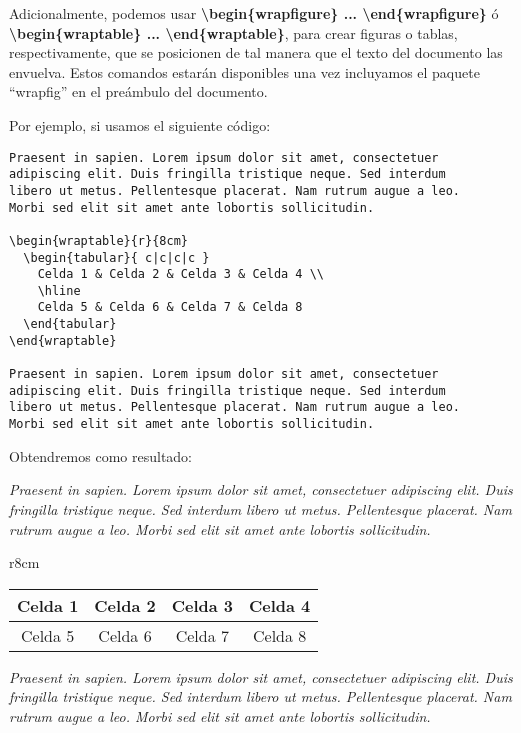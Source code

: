 Adicionalmente, podemos usar \textbf{\textbackslash begin\{wrapfigure\} ... \textbackslash end\{wrapfigure\}} ó \textbf{\textbackslash begin\{wraptable\} ... \textbackslash end\{wraptable\}}, para crear figuras o tablas, respectivamente, que se posicionen de tal manera que el texto del documento las envuelva. Estos comandos estarán disponibles una vez incluyamos el paquete ``wrapfig'' en el preámbulo del documento.

Por ejemplo, si usamos el siguiente código:

\begin{lstlisting}[language={[LaTeX]TeX}]
Praesent in sapien. Lorem ipsum dolor sit amet, consectetuer 
adipiscing elit. Duis fringilla tristique neque. Sed interdum 
libero ut metus. Pellentesque placerat. Nam rutrum augue a leo. 
Morbi sed elit sit amet ante lobortis sollicitudin.

\begin{wraptable}{r}{8cm}
  \begin{tabular}{ c|c|c|c }
    Celda 1 & Celda 2 & Celda 3 & Celda 4 \\
    \hline
    Celda 5 & Celda 6 & Celda 7 & Celda 8
  \end{tabular}
\end{wraptable}

Praesent in sapien. Lorem ipsum dolor sit amet, consectetuer 
adipiscing elit. Duis fringilla tristique neque. Sed interdum 
libero ut metus. Pellentesque placerat. Nam rutrum augue a leo. 
Morbi sed elit sit amet ante lobortis sollicitudin.
\end{lstlisting}


Obtendremos como resultado:

\emph{Praesent in sapien. Lorem ipsum dolor sit amet, consectetuer 
adipiscing elit. Duis fringilla tristique neque. Sed interdum 
libero ut metus. Pellentesque placerat. Nam rutrum augue a leo. 
Morbi sed elit sit amet ante lobortis sollicitudin.}

\begin{wraptable}{r}{8cm}
\begin{tabular}{ c|c|c|c }
 		Celda 1 & Celda 2 & Celda 3 & Celda 4 \\
 		\hline
 		Celda 5 & Celda 6 & Celda 7 & Celda 8
\end{tabular}
\end{wraptable}

\emph{Praesent in sapien. Lorem ipsum dolor sit amet, consectetuer 
adipiscing elit. Duis fringilla tristique neque. Sed interdum 
libero ut metus. Pellentesque placerat. Nam rutrum augue a leo. 
Morbi sed elit sit amet ante lobortis sollicitudin.}

